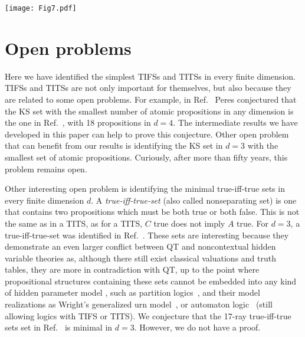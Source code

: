 \documentclass[%
 twocolumn,
 groupedaddress,
 showpacs,
 showkeys,
 preprintnumbers,
 amsmath,amssymb,
 aps,
 pra,
 longbibliography,
 floatfix,
 ]{revtex4-1}
\begin{document}

\begin{figure*}
	\texttt{[image: Fig7.pdf]}
	\caption{\label{fig:d6}
		(Color online)
		Greechie orthogonality diagrams of the eight minimal TIFs in $d=6$. All of them have 11 propositions and 9 contexts.}
\end{figure*}


\section{Open problems}


Here we have identified the simplest TIFSs and TITSs in every finite dimension. TIFSs and TITSs are not only important for themselves, but also because they are related to some open problems. For example, in Ref.\ \cite{Peres03} Peres conjectured that the KS set with the smallest number of atomic propositions in any dimension is the one in Ref.\ \cite{CEG96}, with 18 propositions in $d=4$. The intermediate results we have developed in this paper can help to prove this conjecture. Other open problem that can benefit from our results is identifying the KS set in $d=3$ with the smallest set of atomic propositions. Curiously, after more than fifty years, this problem remains open.

Other interesting open problem is identifying the minimal true-iff-true sets in every finite dimension $d$. A {\em true-iff-true-set} (also called nonseparating set) is one that contains two propositions which must be both true or both false. This is not the same as in a TITS, as for a TITS, $C$ true does not imply $A$ true. For $d=3$, a true-iff-true-set was identified in Ref.\ \cite{KS67}. These sets are interesting because they demonstrate an even larger conflict between QT and noncontextual hidden variable theories as, although there still exist classical valuations and truth tables, they are more in contradiction with QT, up to the point where propositional structures containing these sets cannot be embedded into any kind of hidden parameter model \cite{KS67}, such as partition logics~\cite{svozil-2001-eua}, and their model realizations as Wright's generalized urn model~\cite{wright}, or automaton logic~\cite{schaller-96} (still allowing logics with TIFS or TITS). We conjecture that the 17-ray true-iff-true sets set in Ref.\ \cite{KS67} is minimal in $d=3$. However, we do not have a proof.
\end{document}
